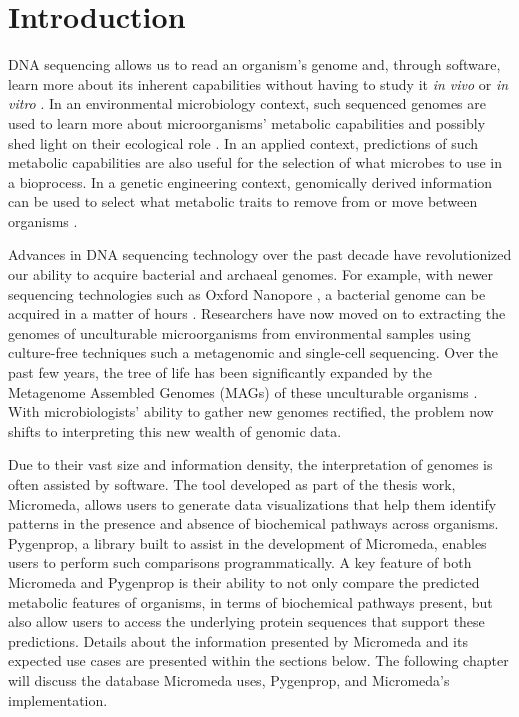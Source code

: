 \chapter{Introduction} \label{introduction}

DNA sequencing allows us to read an organism's genome and, through software, learn more about its inherent capabilities without having to study it \textit{in vivo} or \textit{in vitro} \cite{de2012bioinformatic}. In an environmental microbiology context, such sequenced genomes are used to learn more about microorganisms' metabolic capabilities and possibly shed light on their ecological role \cite{de2012bioinformatic}. In an applied context, predictions of such metabolic capabilities are also useful for the selection of what microbes to use in a bioprocess. In a genetic engineering context, genomically derived information can be used to select what metabolic traits to remove from or move between organisms \cite{strohl2001biochemical,sanchez2005novel}.

Advances in DNA sequencing technology over the past decade have revolutionized our ability to acquire bacterial and archaeal genomes. For example, with newer sequencing technologies such as Oxford Nanopore \cite{jain2016oxford}, a bacterial genome can be acquired in a matter of hours \cite{Lu2016,Cao2017}. Researchers have now moved on to extracting the genomes of unculturable microorganisms from environmental samples using culture-free techniques such a metagenomic \cite{quince2017shotgun} and single-cell \cite{gawad2016single} sequencing. Over the past few years, the tree of life has been significantly expanded by the Metagenome Assembled Genomes (MAGs) \cite{bowers2017minimum} of these unculturable organisms \cite{Hug2016,Parks2017}. With microbiologists' ability to gather new genomes rectified, the problem now shifts to interpreting this new wealth of genomic data.

Due to their vast size and information density, the interpretation of genomes is often assisted by software. The tool developed as part of the thesis work, Micromeda, allows users to generate data visualizations that help them identify patterns in the presence and absence of biochemical pathways across organisms. Pygenprop, a library built to assist in the development of Micromeda, enables users to perform such comparisons programmatically. A key feature of both Micromeda and Pygenprop is their ability to not only compare the predicted metabolic features of organisms, in terms of biochemical pathways present, but also allow users to access the underlying protein sequences that support these predictions. Details about the information presented by Micromeda and its expected use cases are presented within the sections below. The following chapter will discuss the database Micromeda uses, Pygenprop, and Micromeda's implementation.

